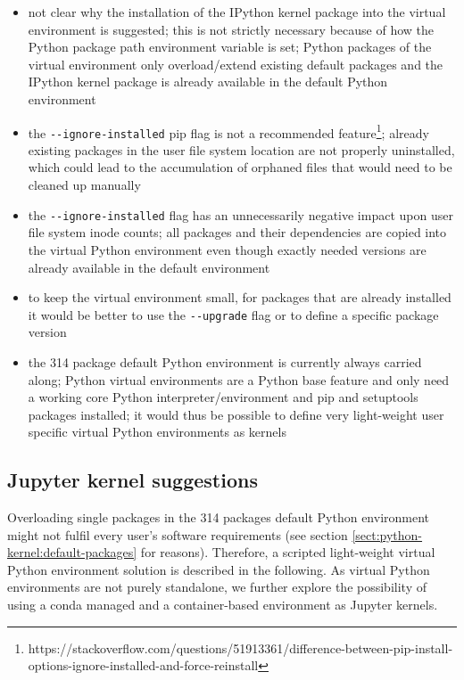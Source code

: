 \documentclass[11pt,a4paper]{article}
\begin{document}
\begin{itemize}

  \item not clear why the installation of the IPython kernel package into the virtual environment is suggested;
  this is not strictly necessary because of how the Python package path environment variable is set;
  Python packages of the virtual environment only overload/extend existing default packages and the IPython kernel package is already available in the default Python environment

  \item the \verb|--ignore-installed| pip flag is not a recommended feature\footnote{https://stackoverflow.com/questions/51913361/difference-between-pip-install-options-ignore-installed-and-force-reinstall};
  already existing packages in the user file system location are not properly uninstalled, which could lead to the accumulation of orphaned files that would need to be cleaned up manually

  \item the \verb|--ignore-installed| flag has an unnecessarily negative impact upon user file system inode counts;
  all packages and their dependencies are copied into the virtual Python environment even though exactly needed versions are already available in the default environment

  \item to keep the virtual environment small, for packages that are already installed it would be better to use the \verb|--upgrade| flag or to define a specific package version

  \item the 314 package default Python environment is currently always carried along;
  Python virtual environments are a Python base feature and only need a working core Python interpreter/environment and pip and setuptools packages installed;
  it would thus be possible to define very light-weight user specific virtual Python environments as kernels

\end{itemize}

\subsection{Jupyter kernel suggestions}
\label{sect:jupyter-kernel-suggestions}

Overloading single packages in the 314 packages default Python environment might not fulfil every user's software requirements (see section \ref{sect:python-kernel:default-packages} for reasons).
Therefore, a scripted light-weight virtual Python environment solution is described in the following.
As virtual Python environments are not purely standalone, we further explore the possibility of using a conda managed and a container-based environment as Jupyter kernels.
\end{document}
